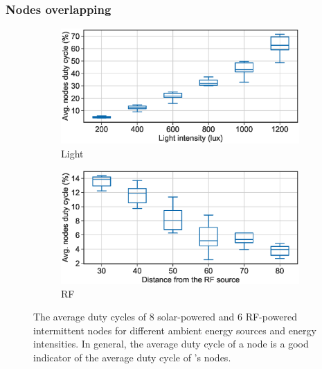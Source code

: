 \subsubsection{Nodes overlapping}
\begin{figure}[t]
		\centering
		\begin{subfigure}{.49\columnwidth}
			\centering
			\includegraphics[width=\textwidth]{figures/cis_dutyCycle}
			\caption{Light}
		\end{subfigure}\hfill
		\begin{subfigure}{.49\columnwidth}
			\centering
			\includegraphics[width=\textwidth]{figures/rf_cis_dutyCycle}
			\caption{RF}
		\end{subfigure}\hfill
		\caption{The average duty cycles of 8 solar-powered and 6 RF-powered intermittent nodes for different ambient energy sources and energy intensities. In general, the average duty cycle of a node is a good indicator of the average duty cycle of \sys's nodes.}
		\label{fig:cis_nodes_dutyCycle}
\end{figure} 

